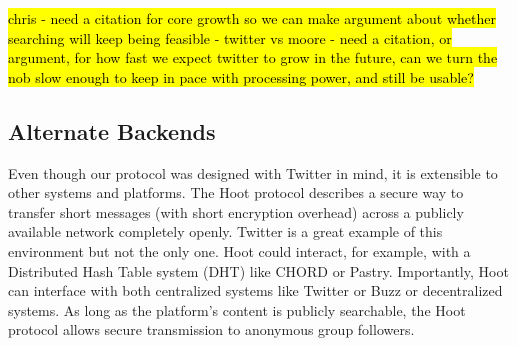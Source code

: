 \hl{
chris 
- need a citation for core growth so we can make argument about whether searching will keep being feasible
- twitter vs moore
- need a citation, or argument, for how fast we expect twitter to grow in the future, can we turn the nob slow enough to keep in pace with processing power, and still be usable? 
}

\subsection{Alternate Backends}

Even though our protocol was designed with Twitter in mind, it is extensible to other systems and platforms. The Hoot protocol describes a secure way to transfer short messages (with short encryption overhead) across a publicly available network completely openly. Twitter is a great example of this environment but not the only one. Hoot could interact, for example, with a Distributed Hash Table system (DHT) like CHORD or Pastry. Importantly, Hoot can interface with both centralized systems like Twitter or Buzz or decentralized systems. As long as the platform's content is publicly searchable, the Hoot protocol allows secure transmission to anonymous group followers.

